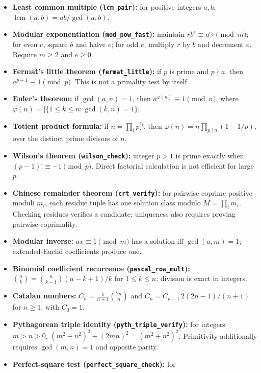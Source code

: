 \documentclass[
  10pt,
]{article}
\providecommand{\tightlist}{%
  \setlength{\itemsep}{0pt}\setlength{\parskip}{0pt}}
\begin{document}
\begin{itemize}
\tightlist
\item
  \textbf{Least common multiple (\texttt{lcm\_pair}):} for positive
  integers \(a,b\), \(\operatorname{lcm}(a,b)=ab/\gcd(a,b)\).
\item
  \textbf{Modular exponentiation (\texttt{mod\_pow\_fast}):} maintain
  \(r b^e\equiv a^{e_0}\pmod m\); for even \(e\), square \(b\) and halve
  \(e\); for odd \(e\), multiply \(r\) by \(b\) and decrement \(e\).
  Require \(m\ge2\) and \(e\ge0\).
\item
  \textbf{Fermat's little theorem (\texttt{fermat\_little}):} if \(p\)
  is prime and \(p\nmid a\), then \(a^{p-1}\equiv1\pmod p\). This is not
  a primality test by itself.
\item
  \textbf{Euler's theorem:} if \(\gcd(a,n)=1\), then
  \(a^{\varphi(n)}\equiv1\pmod n\), where
  \(\varphi(n)=|\{1\le k\le n:\gcd(k,n)=1\}|\).
\item
  \textbf{Totient product formula:} if \(n=\prod_i p_i^{e_i}\), then
  \(\varphi(n)=n\prod_{p\mid n}(1-1/p)\), over the distinct prime
  divisors of \(n\).
\item
  \textbf{Wilson's theorem (\texttt{wilson\_check}):} integer \(p>1\) is
  prime exactly when \((p-1)!\equiv-1\pmod p\). Direct factorial
  calculation is not efficient for large \(p\).
\item
  \textbf{Chinese remainder theorem (\texttt{crt\_verify}):} for
  pairwise coprime positive moduli \(m_i\), each residue tuple has one
  solution class modulo \(M=\prod_i m_i\). Checking residues verifies a
  candidate; uniqueness also requires proving pairwise coprimality.
\item
  \textbf{Modular inverse:} \(ax\equiv1\pmod m\) has a solution iff
  \(\gcd(a,m)=1\); extended-Euclid coefficients produce one.
\item
  \textbf{Binomial coefficient recurrence (\texttt{pascal\_row\_mult}):}
  \(\binom nk=\binom n{k-1}(n-k+1)/k\) for \(1\le k\le n\); division is
  exact in integers.
\item
  \textbf{Catalan numbers:} \(C_n=\frac1{n+1}\binom{2n}{n}\) and
  \(C_n=C_{n-1}\,2(2n-1)/(n+1)\) for \(n\ge1\), with \(C_0=1\).
\item
  \textbf{Pythagorean triple identity (\texttt{pyth\_triple\_verify}):}
  for integers \(m>n>0\), \((m^2-n^2)^2+(2mn)^2=(m^2+n^2)^2\).
  Primitivity additionally requires \(\gcd(m,n)=1\) and opposite parity.
\item
  \textbf{Perfect-square test (\texttt{perfect\_square\_check}):} for

\end{itemize}
\end{document}

